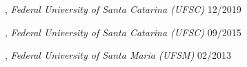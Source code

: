 , \textit{Federal University of Santa Catarina (UFSC)}	\hfill 12/2019

, \textit{Federal University of Santa Catarina (UFSC)}	\hfill 09/2015

, \textit{Federal University of Santa Maria (UFSM)} \hfill	02/2013